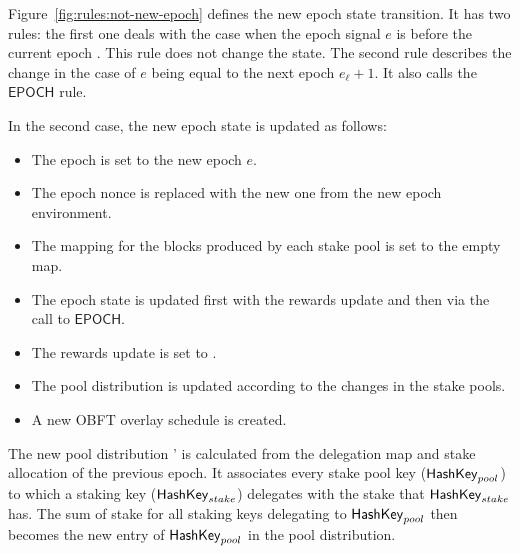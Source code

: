 Figure~\ref{fig:rules:not-new-epoch} defines the new epoch state transition. It
has two rules: the first one deals with the case when the epoch signal $e$ is before the
current epoch . This rule does not change the state. The second rule
describes the change in the case of $e$ being equal to the next epoch
$e_\ell+ 1$. It also calls the $\mathsf{EPOCH}$ rule.

In the second case, the new epoch state is updated as follows:

\begin{itemize}
\item The epoch is set to the new epoch $e$.
\item The epoch nonce is replaced with the new one from the new epoch
  environment.
\item The mapping for the blocks produced by each stake pool is set to the empty
  map.
\item The epoch state is updated first with the rewards update  and then
  via the call to $\mathsf{EPOCH}$.
\item The rewards update is set to \Nothing.
\item The pool distribution is updated according to the changes in the stake pools.
\item A new OBFT overlay schedule is created.
\end{itemize}

The new pool distribution ' is calculated from the delegation map and
stake allocation of the previous epoch. It associates every stake pool key
($\mathsf{HashKey}_{pool}$) to which a staking key ($\mathsf{HashKey}_{stake}$) delegates with
the stake that $\mathsf{HashKey}_{stake}$ has. The sum of stake for all staking keys
delegating to $\mathsf{HashKey}_{pool}$ then becomes the new entry of $\mathsf{HashKey}_{pool}$
in the pool distribution.

